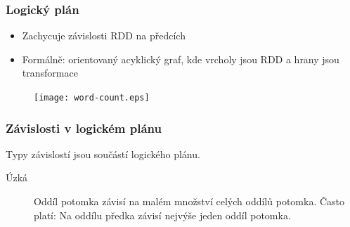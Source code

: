 \documentclass[xcolor=dvipsnames,compact]{beamer}
\begin{document}
\begin{frame}
	\frametitle{Logický plán}
	\begin{itemize}
		\item Zachycuje závislosti RDD na předcích
		\item Formálně: orientovaný acyklický graf, kde vrcholy jsou RDD a hrany jsou transformace
	\end{itemize}
	\begin{figure}
		\begin{center}
			\texttt{[image: word-count.eps]}
		\end{center}
	\end{figure}
\end{frame}

\begin{frame}[t]
	\frametitle{Závislosti v logickém plánu}
	Typy závislostí jsou součástí logického plánu.
	\begin{description}
		\item[Úzká] Oddíl potomka závisí na malém množství celých oddílů potomka.
		Často platí: Na oddílu předka závisí nejvýše jeden oddíl potomka.
\end{description}
\end{frame}
\end{document}
